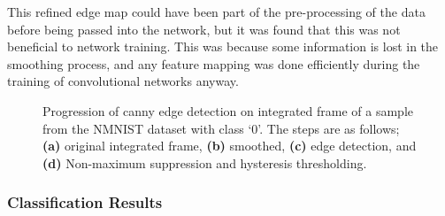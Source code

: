 This refined edge map could have been part of the pre-processing of the data before being passed into the network, but it was found that this was not beneficial to network training. This was because some information is lost in the smoothing process, and any feature mapping was done efficiently during the training of convolutional networks anyway.

\begin{figure}[htb]%
    \centering
    \qquad
    \qquad
    \qquad
    \caption{Progression of canny edge detection on integrated frame of a sample from the NMNIST dataset with class `0'. The steps are as follows; \textbf{(a)} original integrated frame, \textbf{(b)} smoothed, \textbf{(c)} edge detection, and \textbf{(d)} Non-maximum suppression and hysteresis thresholding.}%
    \label{fig:canny_edge_detection_nmnist}%
\end{figure}

\subsubsection{Classification Results}


